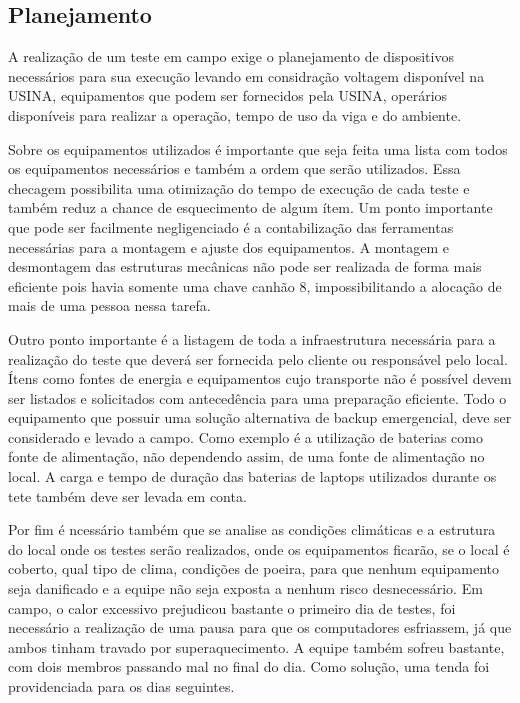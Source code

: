 \subsection{Planejamento}
A realização de um teste em campo exige o planejamento de dispositivos
necessários para sua execução levando em considração voltagem disponível na
USINA, equipamentos que podem ser fornecidos pela USINA, operários disponíveis
para realizar a operação, tempo de uso da viga e do ambiente. 

Sobre os equipamentos utilizados é importante que seja feita uma lista com todos
os equipamentos necessários e também a ordem que serão utilizados. Essa checagem
possibilita uma otimização do tempo de execução de cada teste e também reduz a
chance de esquecimento de algum ítem. Um ponto importante que pode ser
facilmente negligenciado é a contabilização das ferramentas necessárias para a
montagem e ajuste dos equipamentos. A montagem
e desmontagem das estruturas mecânicas não pode ser realizada de forma mais
eficiente pois havia somente uma chave canhão 8, impossibilitando a alocação de
mais de uma pessoa nessa tarefa.

Outro ponto importante é a listagem de toda a infraestrutura necessária para a
realização do teste que deverá ser fornecida pelo cliente ou responsável pelo
local. Ítens como fontes de energia e equipamentos cujo transporte não é
possível devem ser listados e solicitados com antecedência para uma preparação
eficiente. Todo o equipamento que possuir uma solução alternativa de backup
emergencial, deve ser considerado e levado a campo. Como exemplo é a utilização
de baterias como fonte de alimentação, não dependendo assim, de uma fonte de
alimentação no local. A carga e tempo de duração das baterias de laptops utilizados durante os
tete também deve ser levada em conta.

Por fim é ncessário também que se analise as condições climáticas e a estrutura
do local onde os testes serão realizados, onde os
equipamentos ficarão, se o local é coberto, qual tipo de clima, condições de poeira, para que nenhum equipamento
seja danificado e a equipe não seja exposta a nenhum risco desnecessário.
Em campo, o calor excessivo prejudicou bastante o primeiro
dia de testes, foi necessário a realização de uma pausa para que os computadores
esfriassem, já que ambos tinham travado por superaquecimento. A equipe também sofreu bastante, com dois membros passando mal
no final do dia. Como solução, uma tenda foi providenciada para os dias
seguintes.

